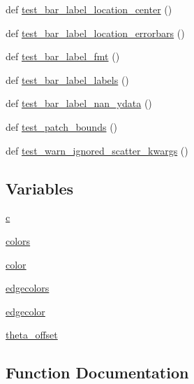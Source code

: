 \begin{DoxyCompactItemize}
def \hyperlink{namespacematplotlib_1_1tests_1_1test__axes_a8650fe1fc06a95c618dc3c477562d65c}{test\+\_\+bar\+\_\+label\+\_\+location\+\_\+center} ()
\item 
def \hyperlink{namespacematplotlib_1_1tests_1_1test__axes_a1c81ad72a58d919e0db6e26def3b3ed5}{test\+\_\+bar\+\_\+label\+\_\+location\+\_\+errorbars} ()
\item 
def \hyperlink{namespacematplotlib_1_1tests_1_1test__axes_abd4444fdce79f47d98305ae7062329d5}{test\+\_\+bar\+\_\+label\+\_\+fmt} ()
\item 
def \hyperlink{namespacematplotlib_1_1tests_1_1test__axes_ae84c55e73ecb0b2109226b1551beecb2}{test\+\_\+bar\+\_\+label\+\_\+labels} ()
\item 
def \hyperlink{namespacematplotlib_1_1tests_1_1test__axes_ac7ddface772a7ed7e5fdde409d96579e}{test\+\_\+bar\+\_\+label\+\_\+nan\+\_\+ydata} ()
\item 
def \hyperlink{namespacematplotlib_1_1tests_1_1test__axes_a88f9bf997fedb7754960d8c5c1c18e13}{test\+\_\+patch\+\_\+bounds} ()
\item 
def \hyperlink{namespacematplotlib_1_1tests_1_1test__axes_a249b64baab38e3d9b7912603453a86eb}{test\+\_\+warn\+\_\+ignored\+\_\+scatter\+\_\+kwargs} ()
\end{DoxyCompactItemize}
\subsection*{Variables}
\begin{DoxyCompactItemize}
\item 
\hyperlink{namespacematplotlib_1_1tests_1_1test__axes_aafe22f55d3b38949ef130319ff0e4cad}{c}
\item 
\hyperlink{namespacematplotlib_1_1tests_1_1test__axes_a1182a5d04ea4e47e42848266de939d2a}{colors}
\item 
\hyperlink{namespacematplotlib_1_1tests_1_1test__axes_a6a0fd50142a5cb4b90208bc0157aa592}{color}
\item 
\hyperlink{namespacematplotlib_1_1tests_1_1test__axes_a35476c8dc0152f8897460b5348c00fd9}{edgecolors}
\item 
\hyperlink{namespacematplotlib_1_1tests_1_1test__axes_a2817e93a065cdd4796f2aff9b5e0e732}{edgecolor}
\item 
\hyperlink{namespacematplotlib_1_1tests_1_1test__axes_aa3ea391b3682869e60018fc3a74bf3b1}{theta\+\_\+offset}
\end{DoxyCompactItemize}


\subsection{Function Documentation}
\mbox{\label{namespacematplotlib_1_1tests_1_1test__axes_a93f7f99ae52cf343343cd9e914364411}} 
